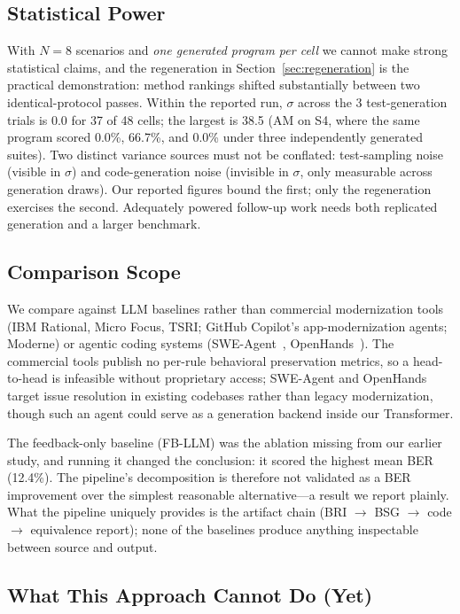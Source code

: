 \documentclass[conference]{IEEEtran}
\begin{document}
\subsection{Statistical Power}

With $N=8$ scenarios and \emph{one generated program per cell} we cannot make strong statistical claims, and the regeneration in Section~\ref{sec:regeneration} is the practical demonstration: method rankings shifted substantially between two identical-protocol passes. Within the reported run, $\sigma$ across the 3 test-generation trials is 0.0 for 37 of 48 cells; the largest is 38.5 (AM on S4, where the same program scored 0.0\%, 66.7\%, and 0.0\% under three independently generated suites). Two distinct variance sources must not be conflated: test-sampling noise (visible in $\sigma$) and code-generation noise (invisible in $\sigma$, only measurable across generation draws). Our reported figures bound the first; only the regeneration exercises the second. Adequately powered follow-up work needs both replicated generation and a larger benchmark.

\subsection{Comparison Scope}

We compare against LLM baselines rather than commercial modernization tools (IBM Rational, Micro Focus, TSRI; GitHub Copilot's app-modernization agents; Moderne) or agentic coding systems (SWE-Agent~\cite{yang2024sweagent}, OpenHands~\cite{wang2024openhands}). The commercial tools publish no per-rule behavioral preservation metrics, so a head-to-head is infeasible without proprietary access; SWE-Agent and OpenHands target issue resolution in existing codebases rather than legacy modernization, though such an agent could serve as a generation backend inside our Transformer.

The feedback-only baseline (FB-LLM) was the ablation missing from our earlier study, and running it changed the conclusion: it scored the highest mean BER (12.4\%). The pipeline's decomposition is therefore not validated as a BER improvement over the simplest reasonable alternative---a result we report plainly. What the pipeline uniquely provides is the artifact chain (BRI $\rightarrow$ BSG $\rightarrow$ code $\rightarrow$ equivalence report); none of the baselines produce anything inspectable between source and output.

\subsection{What This Approach Cannot Do (Yet)}
\end{document}
